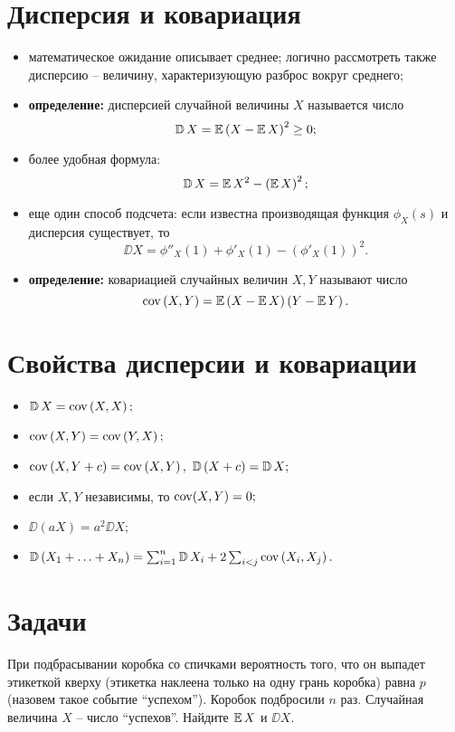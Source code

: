 \section*{Дисперсия и ковариация}
\begin{itemize}
    \item
    математическое ожидание описывает среднее;
    логично рассмотреть также дисперсию -- величину, характеризующую разброс вокруг среднего;
    \item
    \textbf{определение:} дисперсией случайной величины $X$ называется число
    \[
        \operatorname{\mathbb{D}} X = \operatorname{\mathbb{E}}\left(X - \operatorname{\mathbb{E}} X\right)^2 \geq 0;
    \]
    \item
    более удобная формула:
    \[
        \operatorname{\mathbb{D}} X = \operatorname{\mathbb{E}} X^2 - \left(\operatorname{\mathbb{E}} X\right)^2;
    \]
    \item
    еще один способ подсчета: если известна производящая функция $\phi_X(s)$ и дисперсия существует, то
    \[
        \DD X = \phi''_X(1) + \phi'_X(1) - \left(\phi'_X(1)\right)^2.
    \]
    \item
    \textbf{определение:} ковариацией случайных величин $X, Y$ называют число 
    \[
        \operatorname{\mathrm{cov}}\left(X, Y\right) = \operatorname{\mathbb{E}}\left(X - \operatorname{\mathbb{E}} X\right)\left(Y - \operatorname{\mathbb{E}} Y\right).
    \]
\end{itemize}

\section*{Свойства дисперсии и ковариации}
\begin{itemize}
    \item
    $
        \operatorname{\mathbb{D}} X = \operatorname{\mathrm{cov}}\left(X, X\right);
    $
    \item
    $
        \operatorname{\mathrm{cov}}\left(X, Y\right) = \operatorname{\mathrm{cov}}\left(Y, X\right);
    $
    \item
    $
        \operatorname{\mathrm{cov}}\left(X, Y + c\right) = \operatorname{\mathrm{cov}}\left(X, Y\right),\ \operatorname{\mathbb{D}}\left(X + c\right) = \operatorname{\mathbb{D}} X;
    $
    \item
    если $X, Y$ независимы, то
    $
        \operatorname{\mathrm{cov}}(X, Y) = 0;
    $
    \item
    $
        \DD \left(a X\right) = a^2 \DD X;
    $
    \item
    $
        \operatorname{\mathbb{D}}\left(X_1 + \ldots + X_n\right) = \sum_{i = 1}^n \operatorname{\mathbb{D}} X_i + 2 \sum_{i < j} \operatorname{\mathrm{cov}}\left(X_i, X_j\right).
    $
\end{itemize}

\section*{Задачи}
\begin{problem}
    При подбрасывании коробка со спичками вероятность того, что он выпадет этикеткой кверху (этикетка наклеена только на одну грань коробка) равна $p$ (назовем такое событие ``успехом'').
    Коробок подбросили $n$ раз.
    Случайная величина $X$ -- число ``успехов''.
    Найдите $\operatorname{\mathbb{E}} X$ и $\DD X$.
\end{problem}

